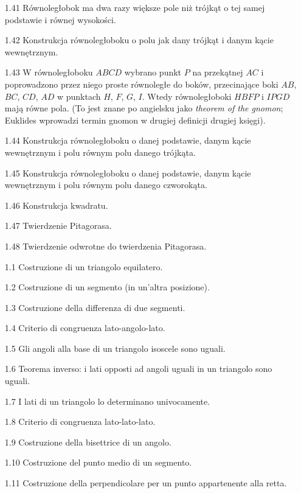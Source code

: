 \begin{enumerate}
    \item [1.41] Równoległobok ma dwa razy większe pole niż trójkąt o tej samej podstawie i równej wysokości. %
    \item [1.42] Konstrukcja równoległoboku o polu jak dany trójkąt i danym kącie wewnętrznym. %
    \item [1.43] W równoległoboku $ABCD$ wybrano punkt $P$ na przekątnej $AC$ i poprowadzono przez niego proste równoległe do boków, przecinające boki $AB$, $BC$, $CD$, $AD$ w punktach $H$, $F$, $G$, $I$. Wtedy równoległoboki $HBFP$ i $IPGD$ mają równe pola. (To jest znane po angielsku jako \emph{theorem of the gnomon}; Euklides wprowadzi termin gnomon w drugiej definicji drugiej księgi). %
    \item [1.44] Konstrukcja równoległoboku o danej podstawie, danym kącie wewnętrznym i polu równym polu danego trójkąta. %
    \item [1.45] Konstrukcja równoległoboku o danej podstawie, danym kącie wewnętrznym i polu równym polu danego czworokąta. %
    \item [1.46] Konstrukcja kwadratu. %
    \item [1.47] Twierdzenie Pitagorasa. %
    \item [1.48] Twierdzenie odwrotne do twierdzenia Pitagorasa. %
    \item [1.1] Costruzione di un triangolo equilatero. %
    \item [1.2] Costruzione di un segmento (in un'altra posizione). %
    \item [1.3] Costruzione della differenza di due segmenti. %
    \item [1.4] Criterio di congruenza lato-angolo-lato. %
    \item [1.5] Gli angoli alla base di un triangolo isoscele sono uguali. %
    \item [1.6] Teorema inverso: i lati opposti ad angoli uguali in un triangolo sono uguali. %
    \item [1.7] I lati di un triangolo lo determinano univocamente. %
    \item [1.8] Criterio di congruenza lato-lato-lato. %
    \item [1.9] Costruzione della bisettrice di un angolo. %
    \item [1.10] Costruzione del punto medio di un segmento. %
    \item [1.11] Costruzione della perpendicolare per un punto appartenente alla retta. %

\end{enumerate}
